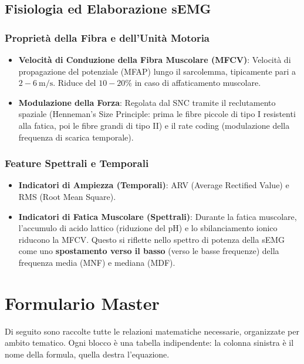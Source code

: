\documentclass[10pt, letterpaper]{report}
\begin{document}
\section{Fisiologia ed Elaborazione sEMG}

\subsection{Proprietà della Fibra e dell'Unità Motoria}
\begin{itemize}
    \item \textbf{Velocità di Conduzione della Fibra Muscolare (MFCV)}: Velocità di propagazione del potenziale (MFAP) lungo il sarcolemma, tipicamente pari a $2-6\ \text{m/s}$. Riduce del $10-20\%$ in caso di affaticamento muscolare.
    \item \textbf{Modulazione della Forza}: Regolata dal SNC tramite il reclutamento spaziale (Henneman's Size Principle: prima le fibre piccole di tipo I resistenti alla fatica, poi le fibre grandi di tipo II) e il rate coding (modulazione della frequenza di scarica temporale).
\end{itemize}

\subsection{Feature Spettrali e Temporali}
\begin{itemize}
    \item \textbf{Indicatori di Ampiezza (Temporali)}: ARV (Average Rectified Value) e RMS (Root Mean Square).
    \item \textbf{Indicatori di Fatica Muscolare (Spettrali)}: Durante la fatica muscolare, l'accumulo di acido lattico (riduzione del pH) e lo sbilanciamento ionico riducono la MFCV.
    Questo si riflette nello spettro di potenza della sEMG come uno \textbf{spostamento verso il basso} (verso le basse frequenze) della frequenza media (MNF) e mediana (MDF).
\end{itemize}

\newpage
\chapter{Formulario Master}

Di seguito sono raccolte tutte le relazioni matematiche necessarie, organizzate per ambito tematico.
Ogni blocco è una tabella indipendente: la colonna sinistra è il nome della formula, quella destra l'equazione.
\end{document}
